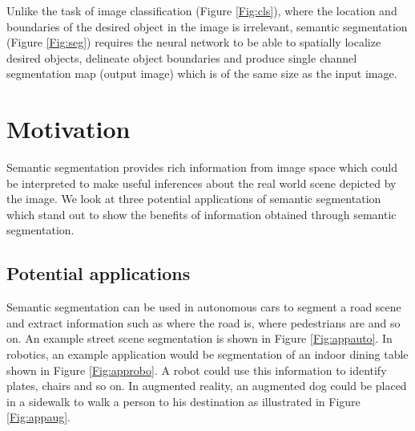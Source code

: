 Unlike the task of image classification (Figure \ref{Fig:cls}), where the location and boundaries of the desired object in the image is irrelevant, semantic segmentation (Figure \ref{Fig:seg}) requires the neural network to be able to spatially localize desired objects, delineate object boundaries and produce single channel segmentation map (output image) which is of the same size as the input image.

\section{Motivation}

Semantic segmentation provides rich information from image space which could be interpreted to make useful inferences about the real world scene depicted by the image. We look at three potential applications of semantic segmentation which stand out to show the benefits of information obtained through semantic segmentation. 

\subsection{Potential applications}

Semantic segmentation can be used in autonomous cars to segment a road scene and extract information such as where the road is, where pedestrians are and so on. An example street scene segmentation is shown in Figure \ref{Fig:appauto}. In robotics, an example application would be segmentation of an indoor dining table shown in Figure \ref{Fig:approbo}. A robot could use this information to identify plates, chairs and so on. In augmented reality, an augmented dog could be placed in a sidewalk to walk a person to his destination as illustrated in Figure \ref{Fig:appaug}. 

